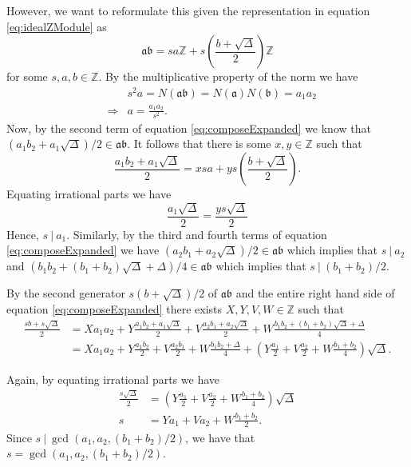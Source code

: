 \documentclass{ucalgthes1}
\theoremstyle{plain}
\theoremstyle{definition}
\newcommand{\ZZ}{\mathbb{Z}}
\begin{document}
\noindent
However, we want to reformulate this given the representation in equation \eqref{eq:idealZModule} as
\[
	\mathfrak{a} \mathfrak{b} = sa \ZZ + s \left(\frac{b + \sqrt{\Delta}}{2}\right) \ZZ
\]
for some $s, a, b \in \ZZ$.  By the multiplicative property of the norm we have
\begin{eqnarray*}
	&& s^2a = N(\mathfrak{a}\mathfrak{b}) = N(\mathfrak{a})N(\mathfrak{b}) = a_1 a_2 \\
	& \Rightarrow & a = \frac{a_1a_2}{s^2}.
\end{eqnarray*}
Now, by the second term of equation \eqref{eq:composeExpanded} we know that $(a_1b_2 + a_1\sqrt{\Delta})/2 \in \mathfrak{a}\mathfrak{b}$.  It follows that there is some $x,y \in \ZZ$ such that
\[
	\frac{a_1b_2 + a_1\sqrt{\Delta}}{2} = xsa + ys\left(\frac{b+\sqrt{\Delta}}{2}\right).
\]
Equating irrational parts we have
\begin{equation*}
	\frac{a_1\sqrt{\Delta}}{2} = \frac{ys\sqrt{\Delta}}{2}
\end{equation*}
\noindent
Hence, $s ~|~ a_1$.  Similarly, by the third and fourth terms of equation \eqref{eq:composeExpanded} we have $(a_2b_1+a_2\sqrt{\Delta})/2 \in \mathfrak{a}\mathfrak{b}$ which implies that $s~|~a_2$ and $(b_1b_2 + (b_1+b_2)\sqrt{\Delta} + \Delta)/4 \in \mathfrak{a}\mathfrak{b}$ which implies that $s~|~(b_1+b_2)/2$. 

By the second generator $s(b+\sqrt\Delta)/2$ of $\mathfrak{a}\mathfrak{b}$ and the entire right hand side of equation \eqref{eq:composeExpanded} there exists $X, Y, V, W \in \ZZ$ such that
\begin{equation}
\label{eq:composeSecond}
\begin{split}
	\frac{sb+s\sqrt\Delta}{2} & = Xa_1a_2 + Y\frac{a_1b_2+a_1\sqrt\Delta}{2} + V\frac{a_2b_1 + a_2\sqrt{\Delta}}{2} + W\frac{b_1b_2 + (b_1+b_2)\sqrt{\Delta} + \Delta}{4} \\
	& = Xa_1a_2 + Y\frac{a_1b_2}{2} + V\frac{a_2b_1}{2} + W\frac{b_1b_2 + \Delta}{4} + \left(Y\frac{a_1}{2} + V\frac{a_2}{2} + W\frac{b_1+b_2}{4}\right)\sqrt\Delta. 
\end{split}
\end{equation}

\noindent
Again, by equating irrational parts we have
\begin{align}
	\frac{s\sqrt\Delta}{2} & = \left(Y\frac{a_1}{2} + V\frac{a_2}{2} + W\frac{b_1+b_2}{4}\right)\sqrt\Delta \nonumber \\
	s & = Ya_1 + Va_2 + W\frac{b_1+b_2}{2}. \label{eq:sAsGCD}
\end{align}
Since $s~|~\gcd(a_1, a_2, (b_1+b_2)/2)$, we have that $s = \gcd(a_1, a_2, (b_1+b_2)/2)$.  
\end{document}
